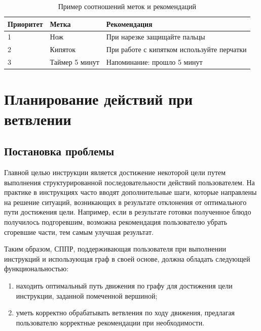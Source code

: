 \begin{table}[h]
	\centering
	\begin{threeparttable}
		\caption{Пример соотношений меток и рекомендаций}
		\label{tbl:recomendations}
		
		\begin{tabularx}{\textwidth}{|X|X|X|}
			\hline
			\textbf{Приоритет}    & \textbf{Метка}                    & \textbf{Рекомендация}                   \\
			\hline
			1  & Нож                 & При нарезке защищайте пальцы                     \\
			\hline
			2 & Кипяток                & При работе с кипятком используйте перчатки                 \\
			\hline
			3 & Таймер 5 минут  & Напоминание: прошло 5 минут\\
			\hline
		\end{tabularx}
	\end{threeparttable}
\end{table}


\section{Планирование действий при ветвлении}
\subsection{Постановка проблемы}

Главной целью инструкции является достижение некоторой цели путем выполнения структурированной последовательности действий пользователем.
На практике в инструкциях часто вводят дополнительные шаги, которые направлены на решение ситуаций, возникающих в результате отклонения от оптимального пути достижения цели.
Например, если в результате готовки полученное блюдо получилось подгоревшим, возможна рекомендация пользователю убрать сгоревшие части, тем самым улучшая результат.

Таким образом, СППР, поддерживающая пользователя при выполнении инструкций и использующая граф в своей основе, должна обладать следующей функциональностью:
\begin{enumerate} 
    \item находить оптимальный путь движения по графу для достижения цели инструкции, заданной помеченной вершиной; 
    \item уметь корректно обрабатывать ветвления по ходу движения, предлагая пользователю корректные рекомендации при необходимости.
\end{enumerate}

